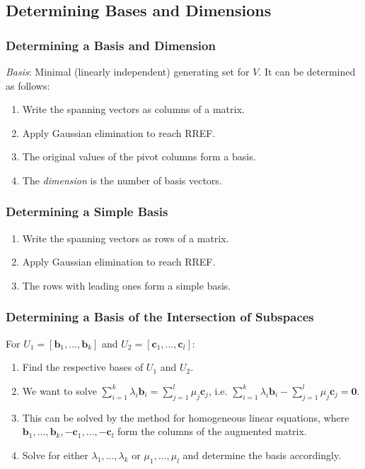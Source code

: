\documentclass[10pt,twoside,twocolumn]{article}
\begin{document}
\subsection{Determining Bases and Dimensions}


\subsubsection{Determining a Basis and Dimension}

\emph{Basis}: Minimal (linearly independent) generating set for $V$.
It can be determined as follows: 
\begin{enumerate}
\item Write the spanning vectors as columns of a matrix. 
\item Apply Gaussian elimination to reach RREF. 
\item The original values of the pivot columns form a basis. 
\item The \emph{dimension} is the number of basis vectors. 
\end{enumerate}

\subsubsection{Determining a Simple Basis}
\begin{enumerate}
\item Write the spanning vectors as rows of a matrix. 
\item Apply Gaussian elimination to reach RREF. 
\item The rows with leading ones form a simple basis. 
\end{enumerate}

\subsubsection{Determining a Basis of the Intersection of Subspaces}

For $U_{1}=\left[\mathbf{b}_{1},\dots,\mathbf{b}_{k}\right]$ and
$U_{2}=\left[\mathbf{c}_{1},\dots,\mathbf{c}_{l}\right]$: 
\begin{enumerate}
\item Find the respective bases of $U_{1}$ and $U_{2}$. 
\item We want to solve $\sum_{i=1}^{k}\lambda_{i}\mathbf{b}_{i}=\sum_{j=1}^{l}\mu_{j}\mathbf{c}_{j}$,
i.e. $\sum_{i=1}^{k}\lambda_{i}\mathbf{b}_{i}-\sum_{j=1}^{l}\mu_{j}\mathbf{c}_{j}=\mathbf{0}$. 
\item This can be solved by the method for homogeneous linear equations,
where $\mathbf{b}_{1},\dots,\mathbf{b}_{k},-\mathbf{c}_{1},\dots,-\mathbf{c}_{l}$
form the columns of the augmented matrix. 
\item Solve for either $\lambda_{1},\dots,\lambda_{k}$ or $\mu_{1},\dots,\mu_{l}$
and determine the basis accordingly. 
\end{enumerate}
\end{document}
